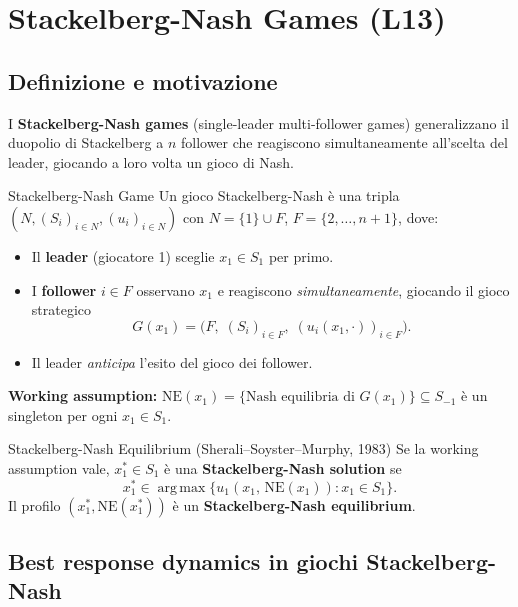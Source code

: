 \documentclass[12pt,a4paper,twoside]{book}
\theoremstyle{plain}
\theoremstyle{definition}
\newcommand{\NE}{\mathrm{NE}}
\newcommand{\argmax}{\operatorname*{arg\,max}}
\begin{document}
\chapter{Stackelberg-Nash Games (L13)}
\label{ch:stackelberg-nash}

\section{Definizione e motivazione}

I \textbf{Stackelberg-Nash games} (single-leader multi-follower games) generalizzano il duopolio di Stackelberg a $n$ follower che reagiscono simultaneamente all'scelta del leader, giocando a loro volta un gioco di Nash.

\begin{defbox}{Stackelberg-Nash Game}
Un gioco Stackelberg-Nash è una tripla $(N,(S_i)_{i\in N},(u_i)_{i\in N})$ con $N=\{1\}\cup F$, $F=\{2,\dots,n+1\}$, dove:
\begin{itemize}
  \item Il \textbf{leader} (giocatore 1) sceglie $x_1\in S_1$ per primo.
  \item I \textbf{follower} $i\in F$ osservano $x_1$ e reagiscono \emph{simultaneamente}, giocando il gioco strategico
    \[G(x_1) = \bigl(F,\;(S_i)_{i\in F},\;(u_i(x_1,\cdot))_{i\in F}\bigr).\]
  \item Il leader \emph{anticipa} l'esito del gioco dei follower.
\end{itemize}
\end{defbox}

\textbf{Working assumption:} $\NE(x_1) = \{\text{Nash equilibria di }G(x_1)\}\subseteq S_{-1}$ è un singleton per ogni $x_1\in S_1$.

\begin{defbox}{Stackelberg-Nash Equilibrium (Sherali--Soyster--Murphy, 1983)}
Se la working assumption vale, $x_1^*\in S_1$ è una \textbf{Stackelberg-Nash solution} se
\[
  x_1^* \in \argmax\{u_1(x_1,\,\NE(x_1)) : x_1\in S_1\}.
\]
Il profilo $(x_1^*,\NE(x_1^*))$ è un \textbf{Stackelberg-Nash equilibrium}.
\end{defbox}

\section{Best response dynamics in giochi Stackelberg-Nash}
\end{document}
